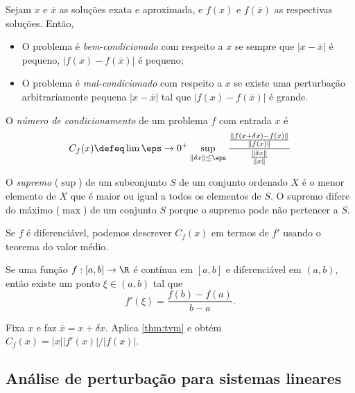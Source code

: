 \documentclass{article}
\begin{document}
\begin{defn}
    Sejam \(x\) e \(\overline{x}\) as soluções exata e aproximada, e \(f(x)\) e \(f(\overline{x})\) as respectivas soluções. Então,
    \begin{itemize}
        \item O problema é \emph{bem-condicionado} com respeito a \(x\) se sempre que \(\vert x - \overline{x}\vert\) é pequeno, \(\vert f(x) - f(\overline{x}) \vert\) é pequeno;
        \item O problema é \emph{mal-condicionado} com respeito a \(x\) se existe uma perturbação arbitrariamente pequena \(\vert x - \overline{x}\vert\) tal que \(\vert f(x) - f(\overline{x}) \vert\) é grande.
    \end{itemize}
\end{defn}

\begin{defn}
    O \emph{número de condicionamento} de um problema \(f\) com entrada \(x\) é
    \begin{equation}
        C_f(x) \defeq \lim{\eps \to 0^{+}} \sup_{\Vert \delta x \Vert \leq \eps} \frac{\frac{\Vert f(x+\delta x)-f(x)\Vert}{\Vert f(x) \Vert}}{\frac{\Vert \delta x \Vert}{\Vert x \Vert}}
    \end{equation}
\end{defn}

\begin{rem}
    O \emph{supremo} (\(\sup\)) de um subconjunto \(S\) de um conjunto ordenado \(X\) é o menor elemento de \(X\) que é maior ou igual a todos os elementos de \(S\). O supremo difere do máximo (\(\max\)) de um conjunto \(S\) porque o supremo pode não pertencer a \(S\).
\end{rem}

Se \(f\) é diferenciável, podemos descrever \(C_f(x)\) em termos de \(f'\) usando o teorema do valor médio.

\begin{thm}  \label{thm:tvm}
    Se uma função \(f: [a,b] \to \R\) é contínua em \([a,b]\) e diferenciável em \((a,b)\), então existe um ponto \(\xi \in (a,b)\) tal que
    \[
        f'(\xi) = \frac{f(b) - f(a)}{b - a}.
    \]
\end{thm}

Fixa \(x\) e faz \(\overline{x}=x+\delta x\). Aplica \eqref{thm:tvm} e obtém \(C_f(x) = \vert x \vert \vert f'(x) \vert / \vert f(x) \vert\).

\subsection{Análise de perturbação para sistemas lineares}
\end{document}
